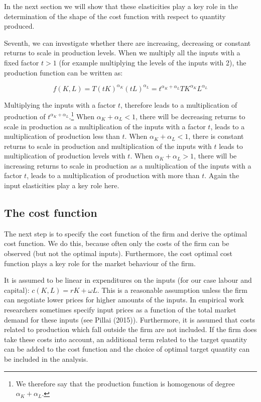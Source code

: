 \documentclass[
]{book}
\begin{document}
In the next section we will show that these elasticities play a key role in the determination of the shape of the cost function with respect to quantity produced.

Seventh, we can investigate whether there are increasing, decreasing or constant returns to scale in production levels. When we multiply all the inputs with a fixed factor \(t>1\) (for example multiplying the levels of the inputs with 2), the production function can be written as:

\begin{equation}
f(K,L) = T(tK)^{\alpha_K}(tL)^{\alpha_L} = t^{\alpha_K + \alpha_L}TK^{\alpha_K}L^{\alpha_L}
\end{equation}

Multiplying the inputs with a factor \(t\), therefore leads to a multiplication of production of \(t^{\alpha_K + \alpha_L}\).\footnote{We therefore say that the production function is homogenous of degree \(\alpha_K + \alpha_L\).} When \(\alpha_K + \alpha_L <1\), there will be decreasing returns to scale in production as a multiplication of the inputs with a factor \(t\), leads to a multiplication of production less than \(t\). When \(\alpha_K + \alpha_L <1\), there is constant returns to scale in production and multiplication of the inputs with \(t\) leads to multiplication of production levels with \(t\). When \(\alpha_K + \alpha_L >1\), there will be increasing returns to scale in production as a multiplication of the inputs with a factor \(t\), leads to a multiplication of production with more than \(t\). Again the input elasticities play a key role here.

\hypertarget{the-cost-function}{%
\subsection{The cost function}\label{the-cost-function}}

The next step is to specify the cost function of the firm and derive the optimal cost function. We do this, because often only the costs of the firm can be observed (but not the optimal inputs). Furthermore, the cost optimal cost function plays a key role for the market behaviour of the firm.

It is assumed to be linear in expenditures on the inputs (for our case labour and capital): \(c(K,L)=rK+\omega L\). This is a reasonable assumption unless the firm can negotiate lower prices for higher amounts of the inputs. In empirical work researchers sometimes specify input prices as a function of the total market demand for these inputs (see Pillai (2015)). Furthermore, it is assumed that costs related to production which fall outside the firm are not included. If the firm does take these costs into account, an additional term related to the target quantity can be added to the cost function and the choice of optimal target quantity can be included in the analysis.
\end{document}
